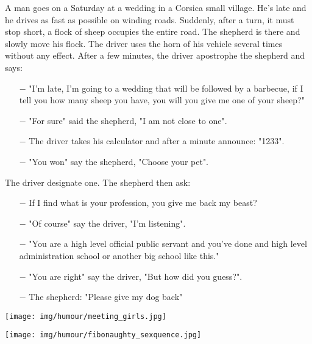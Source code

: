 A man goes on a Saturday at a wedding in a Corsica small village. He's late and he drives as fast as possible on winding roads. Suddenly, after a turn, it must stop short, a flock of sheep occupies the entire road. The shepherd is there and slowly move his flock. The driver uses the horn of his vehicle several times without any effect. After a few minutes, the driver apostrophe the shepherd and says:
\begin{itemize}
	\item[$-$] "I'm late, I'm going to a wedding that will be followed by a barbecue, if I tell you how many sheep you have, you will you give me one of your sheep?"

	\item[$-$] "For sure" said the shepherd, "I am not close to one". 

	\item[$-$] The driver takes his calculator and after a minute announce: "1233".

	\item[$-$] "You won" say the shepherd, "Choose your pet".
\end{itemize}
The driver designate one. The shepherd then ask:
\begin{itemize}
	\item[$-$] If I find what is your profession, you give me back my beast?

	\item[$-$] "Of course" say the driver, "I'm listening".

	\item[$-$] "You are a high level official public servant and you've done and high level administration school or another big school like this."

	\item[$-$] "You are right" say the driver, "But how did you guess?".

	\item[$-$] The shepherd: "Please give my dog back"
\end{itemize}
\begin{center}\underline{\hspace{5 cm}}\end{center}

	\begin{center}
	\texttt{[image: img/humour/meeting\_girls.jpg]}
	\end{center}

	\begin{center}
	\texttt{[image: img/humour/fibonaughty\_sexquence.jpg]}
	\end{center}
	
